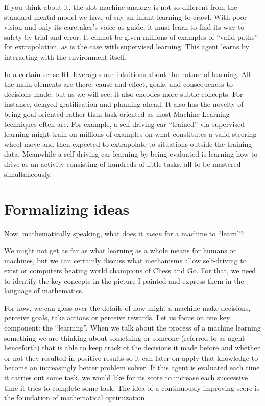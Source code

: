 If you think about it, the slot machine analogy is not so 
different from the standard mental model we have of say an 
infant learning to crawl.  With poor vision and only its 
caretaker's voice as guide, it must learn to find its way to 
safety by trial and error. It cannot be given millions of 
examples of ``valid paths'' for extrapolation, as is the case 
with supervised learning. This agent learns by interacting with 
the environment itself.

In a certain sense RL leverages our intuitions about the nature 
of learning. All the main elements are there: cause and effect, 
goals, and consequences to decisions made, but as we will see, 
it also encodes more subtle concepts. For instance, delayed 
gratification and planning ahead. It also has the novelty of 
being goal-oriented rather than task-oriented as most Machine 
Learning techniques often are. For example, a self-driving car 
``trained'' via supervised learning might train on millions of 
examples on what constitutes a valid steering wheel move and 
then expected to extrapolate to situations outside the training 
data. Meanwhile a self-driving car learning by being evaluated 
is learning how to drive as an activity consisting of hundreds 
of little tasks, all to be mastered simultaneously.

\section{Formalizing ideas}
Now, mathematically speaking, what does it \textit{mean} for a 
machine to ``learn''?

We might not get as far as what learning as a whole means for 
humans or machines, but we can certainly discuss what 
mechanisms allow self-driving to exist or computers beating 
world champions of Chess and Go. For that, we need to identify 
the key concepts in the picture I painted and express them in 
the language of mathematics.

For now, we can gloss over the details of how might a machine 
make decisions, perceive goals, take actions or perceive 
rewards. Let us focus on one key component: the ``learning''. 
When we talk about the process of a machine learning something 
we are thinking about something or someone (referred to as 
agent henceforth) that is able to keep track of the decisions 
it made before and whether or not they resulted in positive 
results so it can later on apply that knowledge to become an 
increasingly better problem solver. If this agent is evaluated 
each time it carries out some task, we would like for its score 
to increase each successive time it tries to complete some 
task. The idea of a continuously improving score is the 
foundation of mathematical optimization.

